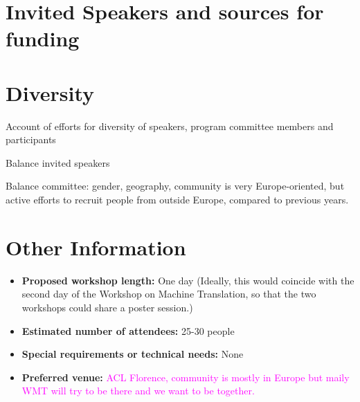 \documentclass[11pt]{article}
\begin{document}
\section{Invited Speakers and sources for funding}



\section{Diversity}

Account of efforts for diversity of speakers, program committee members and participants

Balance invited speakers

Balance committee: gender, geography, community is very Europe-oriented, but active efforts to recruit people from outside Europe, compared to previous years. 



\section{Other Information}

\begin{itemize}
\item \textbf{Proposed workshop length:} One day (Ideally, this would coincide with
the second day of the Workshop on Machine Translation, so that the two workshops could
share a poster session.)

\item \textbf{Estimated number of attendees:} 25-30 people

\item \textbf{Special requirements or technical needs:} None

\item \textbf{Preferred venue:} \textcolor{magenta}{ACL Florence, community is mostly in Europe but maily WMT will try to be there and we want to be together.} 
\end{itemize}
\end{document}
